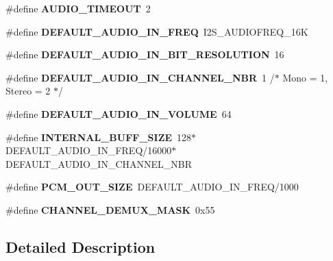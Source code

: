 \begin{DoxyCompactItemize}
\#define {\bfseries A\+U\+D\+I\+O\+\_\+\+T\+I\+M\+E\+O\+UT}~2
\item 
\mbox{\label{group___s_t_m32_f4___d_i_s_c_o_v_e_r_y___a_u_d_i_o___o_u_t___exported___constants_gad58e4247bb44b0134b9644aac69c26d0}} 
\#define {\bfseries D\+E\+F\+A\+U\+L\+T\+\_\+\+A\+U\+D\+I\+O\+\_\+\+I\+N\+\_\+\+F\+R\+EQ}~I2\+S\+\_\+\+A\+U\+D\+I\+O\+F\+R\+E\+Q\+\_\+16K
\item 
\mbox{\label{group___s_t_m32_f4___d_i_s_c_o_v_e_r_y___a_u_d_i_o___o_u_t___exported___constants_ga0d8a8b3645f006164f561d4d49228058}} 
\#define {\bfseries D\+E\+F\+A\+U\+L\+T\+\_\+\+A\+U\+D\+I\+O\+\_\+\+I\+N\+\_\+\+B\+I\+T\+\_\+\+R\+E\+S\+O\+L\+U\+T\+I\+ON}~16
\item 
\mbox{\label{group___s_t_m32_f4___d_i_s_c_o_v_e_r_y___a_u_d_i_o___o_u_t___exported___constants_ga010d40bdaffda171b8345deaef75e0e0}} 
\#define {\bfseries D\+E\+F\+A\+U\+L\+T\+\_\+\+A\+U\+D\+I\+O\+\_\+\+I\+N\+\_\+\+C\+H\+A\+N\+N\+E\+L\+\_\+\+N\+BR}~1 /$\ast$ Mono = 1, Stereo = 2 $\ast$/
\item 
\mbox{\label{group___s_t_m32_f4___d_i_s_c_o_v_e_r_y___a_u_d_i_o___o_u_t___exported___constants_ga462e4d779c8c0240442eb6c9b0544f3a}} 
\#define {\bfseries D\+E\+F\+A\+U\+L\+T\+\_\+\+A\+U\+D\+I\+O\+\_\+\+I\+N\+\_\+\+V\+O\+L\+U\+ME}~64
\item 
\mbox{\label{group___s_t_m32_f4___d_i_s_c_o_v_e_r_y___a_u_d_i_o___o_u_t___exported___constants_ga29cd5f6c8d9a5ffc9c84e8d02044ff22}} 
\#define {\bfseries I\+N\+T\+E\+R\+N\+A\+L\+\_\+\+B\+U\+F\+F\+\_\+\+S\+I\+ZE}~128$\ast$D\+E\+F\+A\+U\+L\+T\+\_\+\+A\+U\+D\+I\+O\+\_\+\+I\+N\+\_\+\+F\+R\+EQ/16000$\ast$D\+E\+F\+A\+U\+L\+T\+\_\+\+A\+U\+D\+I\+O\+\_\+\+I\+N\+\_\+\+C\+H\+A\+N\+N\+E\+L\+\_\+\+N\+BR
\item 
\mbox{\label{group___s_t_m32_f4___d_i_s_c_o_v_e_r_y___a_u_d_i_o___o_u_t___exported___constants_gac7d1b86048167f3665ca7931fd14d289}} 
\#define {\bfseries P\+C\+M\+\_\+\+O\+U\+T\+\_\+\+S\+I\+ZE}~D\+E\+F\+A\+U\+L\+T\+\_\+\+A\+U\+D\+I\+O\+\_\+\+I\+N\+\_\+\+F\+R\+EQ/1000
\item 
\mbox{\label{group___s_t_m32_f4___d_i_s_c_o_v_e_r_y___a_u_d_i_o___o_u_t___exported___constants_ga14c8282af2fb5ecbcbafef2b2f4705f7}} 
\#define {\bfseries C\+H\+A\+N\+N\+E\+L\+\_\+\+D\+E\+M\+U\+X\+\_\+\+M\+A\+SK}~0x55
\end{DoxyCompactItemize}


\subsection{Detailed Description}
